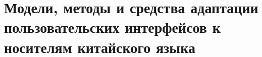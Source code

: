 \chapter{Модели, методы и средства адаптации пользовательских интерфейсов к носителям китайского языка}
\label{chapter_chinese_interfaces}


%